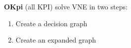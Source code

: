 \documentclass[aspectratio=169]{beamer}
\begin{document}
\begin{frame}
    \frametitle{\secname}
    \framesubtitle{\subsecname}

    \textbf{OKpi} (all KPI) solve VNE in two steps:
    \begin{enumerate}
        \item Create a decision graph 
        \item Create an expanded graph
    \end{enumerate}
\end{frame}





\end{document}
